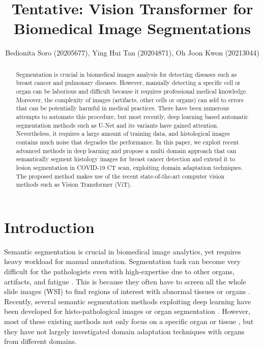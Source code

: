 \documentclass[final]{cvpr}
\begin{document}
\title{Tentative: Vision Transformer for Biomedical Image Segmentations}
\author{Bedionita Soro (20205677), Ying Hui Tan (20204871), Oh Joon Kwon (20213044)}

\maketitle

\begin{abstract}
Segmentation is crucial in biomedical images analysis for detecting diseases such as breast cancer and pulmonary diseases. However, manually detecting a specific cell or organ can be laborious and difficult because it requires professional medical knowledge. Moreover, the complexity of images (artifacts, other cells or organs) can add to errors that can be potentially harmful in medical practices. There have been numerous attempts to automate this procedure, but most recently, deep learning based automatic segmentation methods such as U-Net and its variants have gained attention. 
Nevertheless, it requires a large amount of training data, and histological images contains much noise that degrades the performance. In this paper, we exploit  recent advanced methods in deep learning and propose a multi domain approach that can semantically segment histology images for breast cancer detection and extend it to lesion segmentation in COVID-19 CT scan, exploiting domain adaptation techniques. The proposed method makes use of the recent state-of-the-art computer vision methods such as Vision Transformer (ViT). 
\end{abstract}


\section{Introduction}
Semantic segmentation is crucial in biomedical image analytics, yet requires heavy workload for manual annotation. Segmentation task can become very difficult for the pathologists even with high-expertise due to other organs, artifacts, and fatigue \cite{KRUPINSKI20061543}. This is because they often have to screen all the whole slide images (WSI) to find regions of interest with abnormal tissues or organs \cite{Randell01}. Recently, several semantic segmentation methods exploiting deep learning have been developed for histo-pathological images or organ segmentation \cite{lei2020medical}. However, most of these existing methods not only focus on a specific organ or tissue \cite{chan2019histosegnet}, but they have not largely investigated domain adaptation techniques with organs from different domains.
\end{document}
